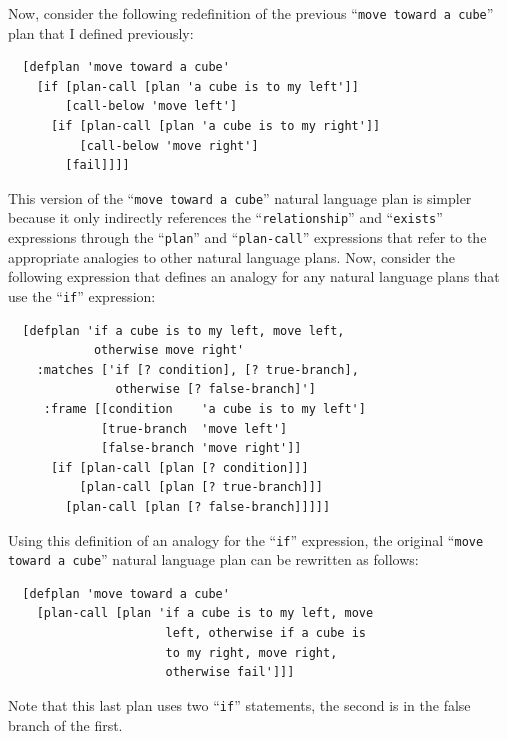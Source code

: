 Now, consider the following redefinition of the previous ``{\tt{move
    toward a cube}}'' plan that I defined previously:
\begin{samepage}
\begin{Verbatim}
  [defplan 'move toward a cube'
    [if [plan-call [plan 'a cube is to my left']]
        [call-below 'move left']
      [if [plan-call [plan 'a cube is to my right']]
          [call-below 'move right']
        [fail]]]]
\end{Verbatim}
\end{samepage}
This version of the ``{\tt{move toward a cube}}'' natural language
plan is simpler because it only indirectly references the
``{\tt{relationship}}'' and ``{\tt{exists}}'' expressions through the
``{\tt{plan}}'' and ``{\tt{plan-call}}'' expressions that refer to the
appropriate analogies to other natural language plans.  Now, consider
the following expression that defines an analogy for any natural
language plans that use the ``{\tt{if}}'' expression:
\begin{samepage}
\begin{Verbatim}
  [defplan 'if a cube is to my left, move left,
            otherwise move right'
    :matches ['if [? condition], [? true-branch],
               otherwise [? false-branch]']
     :frame [[condition    'a cube is to my left']
             [true-branch  'move left']
             [false-branch 'move right']]
      [if [plan-call [plan [? condition]]]
          [plan-call [plan [? true-branch]]]
        [plan-call [plan [? false-branch]]]]]
\end{Verbatim}
\end{samepage}
Using this definition of an analogy for the ``{\tt{if}}'' expression,
the original ``{\tt{move toward a cube}}'' natural language plan can
be rewritten as follows:
\begin{samepage}
\begin{Verbatim}
  [defplan 'move toward a cube'
    [plan-call [plan 'if a cube is to my left, move
                      left, otherwise if a cube is
                      to my right, move right,
                      otherwise fail']]]
\end{Verbatim}
\end{samepage}
Note that this last plan uses two ``{\tt{if}}'' statements, the second
is in the false branch of the first.

